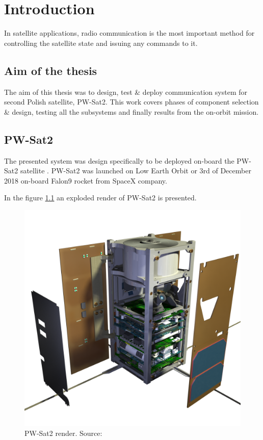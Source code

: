 \chapter{Introduction}

In satellite applications, radio communication is the most important method for controlling the satellite state and issuing any commands to it. 

\section{Aim of the thesis}

The aim of this thesis was to design, test \& deploy communication system for second Polish satellite, PW-Sat2. This work covers phases of component selection \& design, testing all the subsystems and finally results from the on-orbit mission.

\section{PW-Sat2}
    The presented system was design specifically to be deployed on-board the PW-Sat2 satellite \cite{PW-Sat2URL}. PW-Sat2 was launched on Low Earth Orbit or 3rd of December 2018 on-board Falon9 rocket from SpaceX company.

    In the figure \ref{PW-Sat_render_01} an exploded render of PW-Sat2 is presented.
    

    \begin{figure}[H]
        \centering
        \includegraphics[width=0.65\paperwidth]{img/4/PW-Sat2_render_01.png}
        \caption{PW-Sat2 render. Source: \cite{PW_sat2_photo}}
        \label{PW-Sat_render_01}
    \end{figure}


